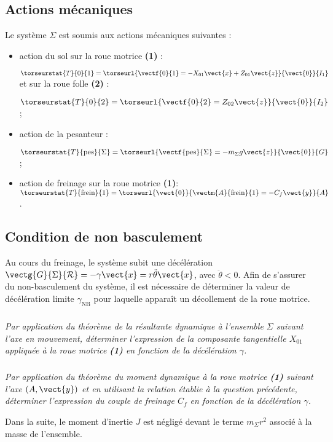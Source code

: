 \begin{multicols}{2}
\subsection*{Actions mécaniques}

Le système $\Sigma$ est soumis aux actions mécaniques suivantes :
\begin{itemize}
\item action du sol sur la roue motrice \textbf{(1)} : 

$\torseurstat{T}{0}{1}=\torseurl{\vectf{0}{1}=-X_{01}\vect{x}+Z_{01}\vect{z}}{\vect{0}}{I_1}$ et sur la roue folle \textbf{(2)} :

$\torseurstat{T}{0}{2}=\torseurl{\vectf{0}{2}=Z_{02}\vect{z}}{\vect{0}}{I_2}$;
\item action de la pesanteur : 

$\torseurstat{T}{\text{pes}}{\Sigma}=\torseurl{\vectf{\text{pes}}{\Sigma}=-m_{\Sigma} g \vect{z}}{\vect{0}}{G}$;
\item action de freinage sur la roue motrice \textbf{(1)}: $\torseurstat{T}{\text{frein}}{1}=\torseurl{\vect{0}}{\vectm{A}{\text{frein}}{1}=-C_f\vect{y}}{A}$.
\end{itemize}


\subsection*{Condition de non basculement}

Au cours du freinage, le système subit une décélération $\vectg{G}{\Sigma}{\mathcal{R}}=-\gamma \vect{x}=r\ddot{\theta} \vect{x}$, avec $\ddot{\theta}<0$. 
Afin de s’assurer du non-basculement du système, il est nécessaire de déterminer la valeur de décélération limite $\gamma_{\text{NB}}$ pour laquelle apparaît un décollement de la roue motrice.


\subparagraph{}\textit{Par application du théorème de la résultante dynamique à l'ensemble $\Sigma$ suivant l'axe en mouvement,
déterminer l'expression de la composante tangentielle $X_{01}$ appliquée à la roue motrice \textbf{(1)} en fonction de la décélération $\gamma$.}

\subparagraph{}\textit{Par application du théorème du moment dynamique à la roue motrice \textbf{(1)} suivant l’axe $\left(A,\vect{y}\right)$ et en utilisant la relation établie à la question précédente, déterminer l’expression du couple de
freinage $C_f$ en fonction de la décélération $\gamma$.}


Dans la suite, le moment d’inertie $J$ est négligé devant le terme $m_{\Sigma}r^2$ associé à la masse de l’ensemble.


\end{multicols}
